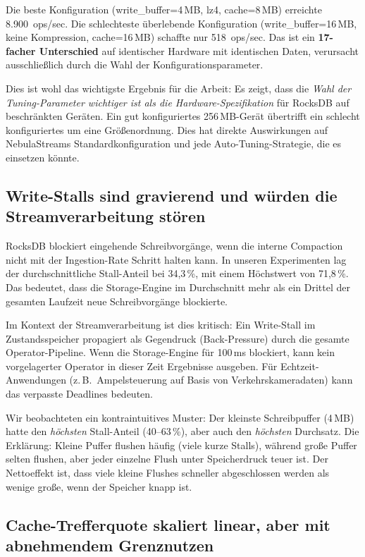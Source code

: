 \documentclass[11pt,a4paper]{scrartcl}
\begin{document}
Die beste Konfiguration (write\_buffer=4\,MB, lz4, cache=8\,MB) erreichte
8.900~ops/sec. Die schlechteste überlebende Konfiguration
(write\_buffer=16\,MB, keine Kompression, cache=16\,MB) schaffte nur
518~ops/sec. Das ist ein \textbf{17-facher Unterschied} auf identischer
Hardware mit identischen Daten, verursacht ausschließlich durch die Wahl der
Konfigurationsparameter.

Dies ist wohl das wichtigste Ergebnis für die Arbeit: Es zeigt, dass die
\emph{Wahl der Tuning-Parameter wichtiger ist als die Hardware-Spezifikation}
für RocksDB auf beschränkten Geräten. Ein gut konfiguriertes 256\,MB-Gerät
übertrifft ein schlecht konfiguriertes um eine Größenordnung. Dies hat direkte
Auswirkungen auf NebulaStreams Standardkonfiguration und jede
Auto-Tuning-Strategie, die es einsetzen könnte.

\subsection{Write-Stalls sind gravierend und würden die Streamverarbeitung stören}

RocksDB blockiert eingehende Schreibvorgänge, wenn die interne Compaction nicht
mit der Ingestion-Rate Schritt halten kann. In unseren Experimenten lag der
durchschnittliche Stall-Anteil bei 34,3\,\%, mit einem Höchstwert von
71,8\,\%. Das bedeutet, dass die Storage-Engine im Durchschnitt mehr als ein
Drittel der gesamten Laufzeit neue Schreibvorgänge blockierte.

Im Kontext der Streamverarbeitung ist dies kritisch: Ein Write-Stall im
Zustandsspeicher propagiert als Gegendruck (Back-Pressure) durch die gesamte
Operator-Pipeline. Wenn die Storage-Engine für 100\,ms blockiert, kann kein
vorgelagerter Operator in dieser Zeit Ergebnisse ausgeben. Für
Echtzeit-Anwendungen (z.\,B.\ Ampelsteuerung auf Basis von
Verkehrskameradaten) kann das verpasste Deadlines bedeuten.

Wir beobachteten ein kontraintuitives Muster: Der kleinste Schreibpuffer
(4\,MB) hatte den \emph{höchsten} Stall-Anteil (40--63\,\%), aber auch den
\emph{höchsten} Durchsatz. Die Erklärung: Kleine Puffer flushen häufig (viele
kurze Stalls), während große Puffer selten flushen, aber jeder einzelne Flush
unter Speicherdruck teuer ist. Der Nettoeffekt ist, dass viele kleine Flushes
schneller abgeschlossen werden als wenige große, wenn der Speicher knapp ist.

\subsection{Cache-Trefferquote skaliert linear, aber mit abnehmendem Grenznutzen}
\end{document}
